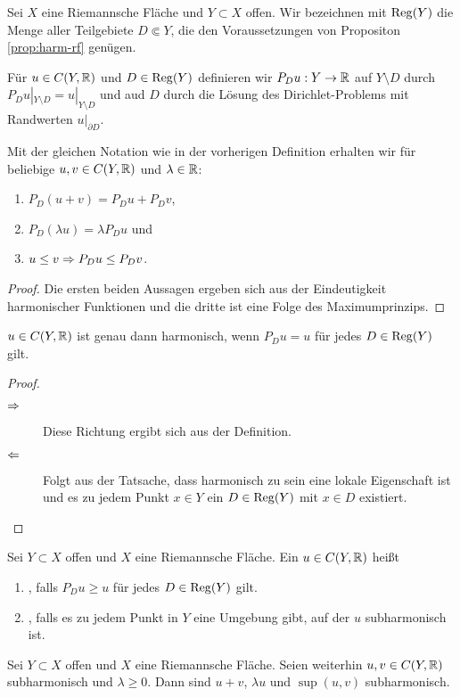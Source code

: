 \begin{defin}
  Sei $X$ eine Riemannsche Fläche und $Y \subset X$ offen. Wir
  bezeichnen mit $\operatorname{Reg}(Y)$ die Menge aller Teilgebiete $D \Subset
  Y$, die den Voraussetzungen von Propositon \ref{prop:harm-rf}
  genügen.
  
  Für $u \in C(Y, \mathbb{R})$ und $D \in \operatorname{Reg}(Y)$ definieren wir $P_D u: Y
  \rightarrow \mathbb{R}$  auf $Y \setminus D$ durch $P_D u |_{Y \setminus D} = u|_{Y
    \setminus D}$ und aud $D$ durch die Lösung des Dirichlet-Problems
  mit Randwerten $u|_{\partial D}$.
\end{defin}

\begin{cor}
  \label{cor:pd-rechenregeln}
  Mit der gleichen Notation wie in der vorherigen Definition erhalten wir
  für beliebige $u, v\in C(Y, \mathbb{R})$ und $\lambda \in \mathbb{R}$:
  \begin{enumerate}
  \item $P_D(u+v) = P_Du + P_D v$,
  \item $P_D(\lambda u) = \lambda P_D u$ und
  \item $u \leq v \Rightarrow P_Du \leq P_D v$.
  \end{enumerate}
\end{cor}

\begin{proof}
  Die ersten beiden Aussagen ergeben sich aus der Eindeutigkeit
  harmonischer \break Funktionen und die dritte ist eine Folge des Maximumprinzips.
\end{proof}

\begin{cor}
  $u \in C(Y, \mathbb{R})$ ist genau dann harmonisch, wenn $P_Du = u $ für
  jedes \break$D \in \operatorname{Reg}(Y)$ gilt.
\end{cor}

\begin{proof}
  \begin{description}
  \item[$\Rightarrow$] Diese Richtung ergibt sich aus der Definition.
  \item[$\Leftarrow$] Folgt aus der Tatsache, dass harmonisch zu sein eine
    lokale Eigenschaft ist und es zu jedem Punkt $x \in Y$ ein $D \in
    \operatorname{Reg}(Y)$ mit $x \in D$ existiert.
  \end{description}
\end{proof}

\begin{defin}
  Sei $Y \subset X$ offen und $X$ eine Riemannsche Fläche.
  Ein $u \in C(Y, \mathbb{R})$ heißt
  \begin{enumerate}
  \item {}, falls $P_D u \geq u$ für jedes $D \in
    \operatorname{Reg}(Y)$ gilt.
  \item {}, falls es zu jedem Punkt in $Y$
    eine Umgebung gibt, auf der $u$ subharmonisch ist.
  \end{enumerate}
\end{defin}
\begin{cor}
  Sei $Y \subset X$ offen und $X$ eine Riemannsche Fläche. Seien
  weiterhin \break$u,v \in C(Y, \mathbb{R})$ subharmonisch und $\lambda \geq
  0$. Dann sind $u+v$, $\lambda u$ und $\sup(u,v)$ subharmonisch.
\end{cor}

